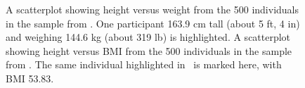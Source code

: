 \begin{figure}[h]
	\centering
    \caption{ A scatterplot showing height versus weight from the 500 individuals in the sample from . One participant 163.9 cm tall (about 5 ft, 4 in) and weighing 144.6 kg (about 319 lb) is highlighted.  A scatterplot showing height versus BMI from the 500 individuals in the sample from . The same individual highlighted in~ is marked here, with BMI 53.83.}\label{hanesHeightWeightBmi} 
\end{figure}


\textD{\newpage}


